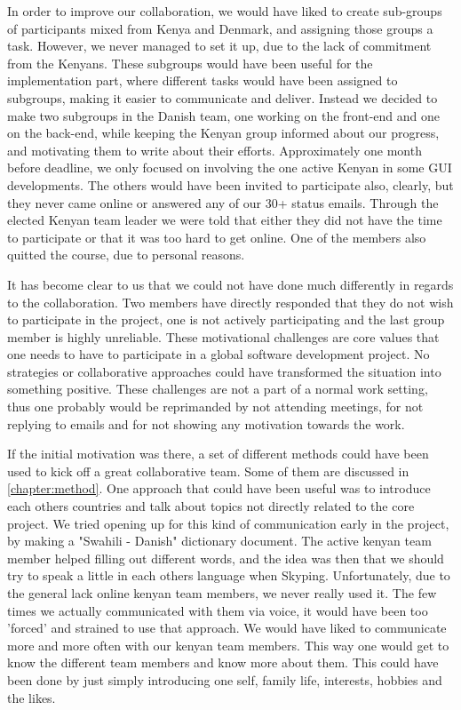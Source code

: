 In order to improve our collaboration, we would have liked to create sub-groups of participants mixed from Kenya and Denmark, and assigning those groups a task. However, we never managed to set it up, due to the lack of commitment from the Kenyans. These subgroups would have been useful for the implementation part, where different tasks would have been assigned to subgroups, making it easier to communicate and deliver. Instead we decided to make two subgroups in the Danish team, one working on the front-end and one on the back-end, while keeping the Kenyan group informed about our progress, and motivating them to write about their efforts. Approximately one month before deadline, we only focused on involving the one active Kenyan in some GUI developments. The others would have been invited to participate also, clearly, but they never came online or answered any of our 30+ status emails. Through the elected Kenyan team leader we were told that either they did not have the time to participate or that it was too hard to get online. One of the members also quitted the course, due to personal reasons. 

It has become clear to us that we could not have done much differently in regards to the collaboration. Two members have directly responded that they do not wish to participate in the project, one is not actively participating and the last group member is highly unreliable. These motivational challenges are core values that one needs to have to participate in a global software development project. No strategies or collaborative approaches could have transformed the situation into something positive. These challenges are not a part of a normal work setting, thus one probably would be reprimanded by not attending meetings, for not replying to emails and for not showing any motivation towards the work.

If the initial motivation was there, a set of different methods could have been used to kick off a great collaborative team. Some of them are discussed in \ref{chapter:method}. One approach that could have been useful was to introduce each others countries and talk about topics not directly related to the core project. We tried opening up for this kind of communication early in the project, by making a "Swahili - Danish" dictionary document. The active kenyan team member helped filling out different words, and the idea was then that we should try to speak a little in each others language when Skyping. Unfortunately, due to the general lack online kenyan team members, we never really used it. The few times we actually communicated with them via voice, it would have been too 'forced' and strained to use that approach. We would have liked to communicate more and more often with our kenyan team members. This way one would get to know the different team members and know more about them. This could have been done by just simply introducing one self, family life, interests, hobbies and the likes.

